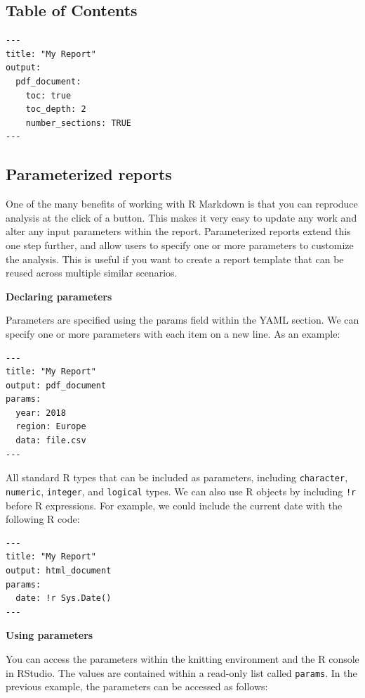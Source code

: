 \documentclass[]{book}
\begin{document}
\subsection{Table of Contents}\label{table-of-contents}

\begin{verbatim}
---
title: "My Report"
output:
  pdf_document:
    toc: true
    toc_depth: 2
    number_sections: TRUE
---
\end{verbatim}

\subsection{Parameterized reports}\label{parameterized-reports}

One of the many benefits of working with R Markdown is that you can
reproduce analysis at the click of a button. This makes it very easy to
update any work and alter any input parameters within the report.
Parameterized reports extend this one step further, and allow users to
specify one or more parameters to customize the analysis. This is useful
if you want to create a report template that can be reused across
multiple similar scenarios.

\textbf{Declaring parameters}

Parameters are specified using the params field within the YAML section.
We can specify one or more parameters with each item on a new line. As
an example:

\begin{verbatim}
---
title: "My Report"
output: pdf_document
params:
  year: 2018
  region: Europe
  data: file.csv
---
\end{verbatim}

All standard R types that can be included as parameters, including
\texttt{character}, \texttt{numeric}, \texttt{integer}, and
\texttt{logical} types. We can also use R objects by including
\texttt{!r} before R expressions. For example, we could include the
current date with the following R code:

\begin{verbatim}
---
title: "My Report"
output: html_document
params:
  date: !r Sys.Date()
---
\end{verbatim}

\textbf{Using parameters}

You can access the parameters within the knitting environment and the R
console in RStudio. The values are contained within a read-only list
called \texttt{params}. In the previous example, the parameters can be
accessed as follows:
\end{document}
